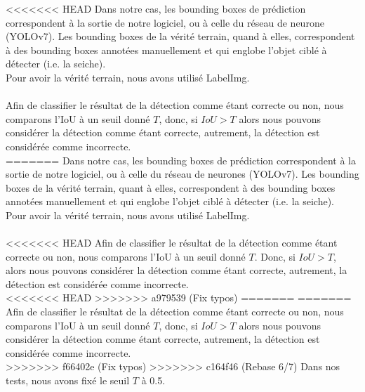 <<<<<<< HEAD
Dans notre cas, les bounding boxes de prédiction correspondent à la sortie de notre logiciel, ou à celle du réseau de neurone (YOLOv7). Les bounding boxes de la vérité terrain, quand à elles, correspondent à des bounding boxes annotées manuellement et qui englobe l'objet ciblé à détecter (i.e. la seiche).\\
Pour avoir la vérité terrain, nous avons utilisé LabelImg.\\
\\
Afin de classifier le résultat de la détection comme étant correcte ou non, nous comparons l'IoU à un seuil donné $T$, donc, si $IoU > T$ alors nous pouvons considérer la détection comme étant correcte, autrement, la détection est considérée comme incorrecte.\\
=======
Dans notre cas, les bounding boxes de prédiction correspondent à la sortie de notre logiciel, ou à celle du réseau de neurones (YOLOv7). Les bounding boxes de la vérité terrain, quant à elles, correspondent à des bounding boxes annotées manuellement et qui englobe l'objet ciblé à détecter (i.e. la seiche).\\
Pour avoir la vérité terrain, nous avons utilisé LabelImg.\\
\\
<<<<<<< HEAD
Afin de classifier le résultat de la détection comme étant correcte ou non, nous comparons l'IoU à un seuil donné $T$. Donc, si $IoU > T$, alors nous pouvons considérer la détection comme étant correcte, autrement, la détection est considérée comme incorrecte.\\
<<<<<<< HEAD
>>>>>>> a979539 (Fix typos)
=======
=======
Afin de classifier le résultat de la détection comme étant correcte ou non, nous comparons l'IoU à un seuil donné $T$, donc, si $IoU > T$ alors nous pouvons considérer la détection comme étant correcte, autrement, la détection est considérée comme incorrecte.\\
>>>>>>> f66402e (Fix typos)
>>>>>>> c164f46 (Rebase 6/7)
Dans nos tests, nous avons fixé le seuil $T$ à 0.5.



\clearpage
